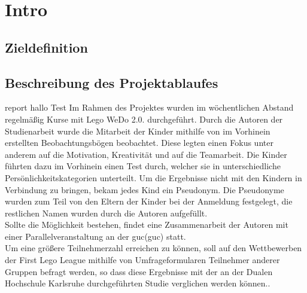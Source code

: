 \chapter{Intro}


\section{Zieldefinition}
\cite{SevenHCIGrandChallenges}




\section{Beschreibung des Projektablaufes}
\gls{report} hallo Test
Im Rahmen des Projektes wurden im wöchentlichen Abstand regelmäßig Kurse mit Lego WeDo 2.0. durchgeführt. Durch die Autoren der Studienarbeit wurde die Mitarbeit der Kinder mithilfe von im Vorhinein erstellten Beobachtungsbögen beobachtet. Diese legten einen Fokus unter anderem auf die Motivation, Kreativität und auf die Teamarbeit. Die Kinder führten dazu im Vorhinein einen Test durch, welcher sie in unterschiedliche Persönlichkeitskategorien unterteilt. Um die Ergebnisse nicht mit den Kindern in Verbindung zu bringen, bekam jedes Kind ein Pseudonym. Die Pseudonyme wurden zum Teil von den Eltern der Kinder bei der Anmeldung festgelegt, die restlichen Namen wurden durch die Autoren aufgefüllt.\\
Sollte die Möglichkeit bestehen, findet eine Zusammenarbeit der Autoren mit einer Parallelveranstaltung an der \acrlong{guc}(\acrshort{guc}) statt.\\
Um eine größere Teilnehmerzahl erreichen zu können, soll auf den Wettbewerben der First Lego League mithilfe von Umfrageformularen Teilnehmer anderer Gruppen befragt werden, so dass diese Ergebnisse mit der an der Dualen Hochschule Karlsruhe durchgeführten Studie verglichen werden können..
